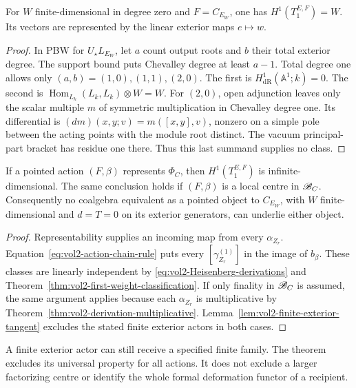 \begin{lemma}\label{lem:vol2-finite-exterior-tangent}
For $W$ finite-dimensional in degree zero and
$F=C_{E_W}$, one has $H^1(T_1^{E,F})=W$.
Its vectors are represented by the linear exterior maps
$e\mapsto w$.
\end{lemma}
\begin{proof}
In PBW for $U_\star L_{E_W}$, let $a$ count output roots
and $b$ their total exterior degree. The support bound
puts Chevalley degree at least $a-1$. Total degree one
allows only $(a,b)=(1,0),(1,1),(2,0)$. The first is
$H^1_{\mathrm{dR}}(\mathbb A^1;k)=0$. The second is
$\operatorname{Hom}_{L_k}(L_k,L_k)\otimes W=W$.
For $(2,0)$, open adjunction leaves only the scalar
multiple $m$ of symmetric multiplication in Chevalley
degree one. Its differential is
$(dm)(x,y;v)=m([x,y],v)$, nonzero on a simple pole between
the acting points with the module root distinct. The vacuum
principal-part bracket has residue one there. Thus this
last summand supplies no class.
\end{proof}

\begin{theorem}\label{thm:vol2-finite-actor-obstruction}
If a pointed action $(F,\beta)$ represents $\Phi_C$, then
$H^1(T_1^{E,F})$ is infinite-dimensional. The same conclusion
holds if $(F,\beta)$ is a local centre in $\mathscr B_C$.
Consequently no coalgebra equivalent as a pointed object
to $C_{E_W}$, with $W$ finite-dimensional and $d=T=0$
on its exterior generators, can underlie either object.
\end{theorem}
\begin{proof}
Representability supplies an incoming map from every
$\alpha_{Z_r}$. Equation~\eqref{eq:vol2-action-chain-rule}
puts every $[\gamma_{Z_r}^{(1)}]$ in the image of $b_\beta$.
These classes are linearly independent by
\eqref{eq:vol2-Heisenberg-derivations} and
Theorem~\ref{thm:vol2-first-weight-classification}.
If only finality in $\mathscr B_C$ is assumed, the same argument
applies because each $\alpha_{Z_r}$ is multiplicative by
Theorem~\ref{thm:vol2-derivation-multiplicative}.
Lemma~\ref{lem:vol2-finite-exterior-tangent} excludes the
stated finite exterior actors in both cases.
\end{proof}

A finite exterior actor can still receive a specified finite
family. The theorem excludes its universal property for all
actions. It does not exclude a larger factorizing centre or
identify the whole formal deformation functor of a recipient.

